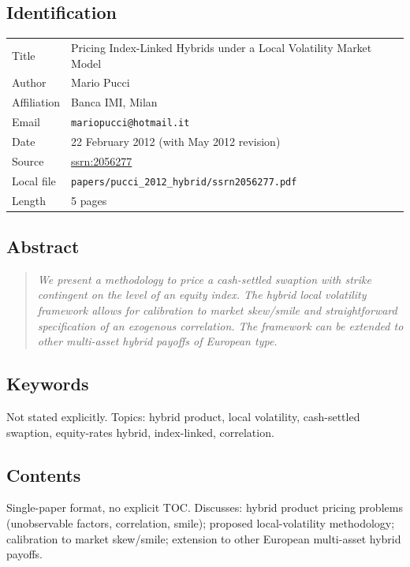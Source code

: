 \documentclass[11pt,a4paper]{article}
\begin{document}
\subsection*{Identification}
\begin{tabular}{@{}p{3.5cm}p{11cm}@{}}
\toprule
Title           & Pricing Index-Linked Hybrids under a Local Volatility Market Model \\
Author          & Mario Pucci \\
Affiliation     & Banca IMI, Milan \\
Email           & \texttt{mariopucci@hotmail.it} \\
Date            & 22 February 2012 (with May 2012 revision) \\
Source          & \href{https://ssrn.com/abstract=2056277}{ssrn:2056277} \\
Local file      & \texttt{papers/pucci\_2012\_hybrid/ssrn2056277.pdf} \\
Length          & 5 pages \\
\bottomrule
\end{tabular}

\subsection*{Abstract}
\begin{quote}\itshape
We present a methodology to price a cash-settled swaption with strike
contingent on the level of an equity index. The hybrid local
volatility framework allows for calibration to market skew/smile and
straightforward specification of an exogenous correlation. The
framework can be extended to other multi-asset hybrid payoffs of
European type.
\end{quote}

\subsection*{Keywords}
Not stated explicitly. Topics: hybrid product, local volatility,
cash-settled swaption, equity-rates hybrid, index-linked,
correlation.

\subsection*{Contents}
Single-paper format, no explicit TOC. Discusses: hybrid product
pricing problems (unobservable factors, correlation, smile);
proposed local-volatility methodology; calibration to market
skew/smile; extension to other European multi-asset hybrid payoffs.
\end{document}
